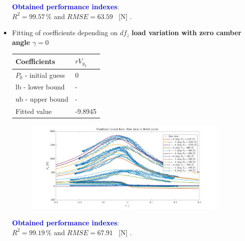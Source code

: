 \documentclass{IEEEtran}
\begin{document}
\begin{itemize}
\begin{figure}[htbp]
                \label{fig:COMB_lat_nom}
            \end{figure}

            \textbf{\textcolor{blue}{Obtained performance indexes}}: \\ $R^{2} = 99.57 \, \%$ and $RMSE = 63.59 $ \, [N] . \\
        
            \item Fitting of coefficients depending on \underline{$df_z$} \textbf{load variation with zero camber angle $\gamma = 0$}\\
            \begin{table}[htbp]
                \begin{center}
                    \begin{tabular}{|l|l|}
                    \hline
                    Coefficients       & $rV_{y_2}$\\
                    \hline
                    $P_0$ - initial guess & 0 \\ \hline
                    lb - lower bound   & - \\ \hline
                    ub - upper bound   & - \\ \hline
                    Fitted value  & -9.8945 \\ \hline
                    \end{tabular}
                \end{center}
            \end{table} 
            \newpage
             \begin{figure}[!h]
                \centerline{\includegraphics[width = 3.95in]{combined_lateral_3.jpg}}
                
                \label{fig:COMB_lat_dfz}
            \end{figure}
            
           

            \textbf{\textcolor{blue}{Obtained performance indexes}}: \\ $R^{2} = 99.19 \, \%$ and $RMSE = 67.91 $ \, [N] . \\


\end{itemize}
\end{document}
